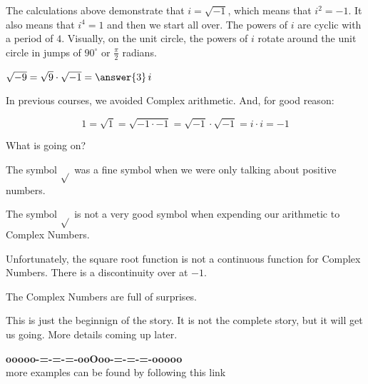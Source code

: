 \documentclass{ximera}
\begin{document}
The calculations above demonstrate that $i = \sqrt{-1}$, which means that $i^2 = -1$.  It also means that $i^4 = 1$ and then we start all over.  The powers of $i$ are cyclic with a period of $4$.  Visually, on the unit circle, the powers of $i$ rotate around the unit circle in jumps of $90^{\circ}$ or $\frac{\pi}{2}$ radians.

\begin{question}


$\sqrt{-9} = \sqrt{9} \cdot \sqrt{-1} =  \answer{3} \, i$

\end{question}

In previous courses, we avoided Complex arithmetic. And, for good reason:

\[  1 = \sqrt{1} = \sqrt{-1 \cdot -1} = \sqrt{-1} \cdot \sqrt{-1} = i \cdot i = -1   \]


What is going on?


The symbol $\sqrt{ }$ was a fine symbol when we were only talking about positive numbers.

The symbol $\sqrt{ }$ is not a very good symbol when expending our arithmetic to Complex Numbers.

Unfortunately, the square root function is not a continuous function for Complex Numbers.  There is a discontinuity over at $-1$.

The Complex Numbers are full of surprises.



This is just the beginnign of the story.  It is not the complete story, but it will get us going.  More details coming up later.





\begin{center}
\textbf{\textcolor{green!50!black}{ooooo-=-=-=-ooOoo-=-=-=-ooooo}} \\

more examples can be found by following this link\\ 

\end{center}
\end{document}
